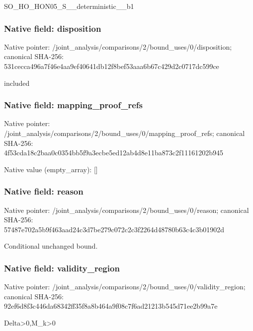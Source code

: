 \documentclass[10pt,a4paper]{article}
\begin{document}
\begingroup\raggedright\sloppy SO\_\allowbreak{}HO\_\allowbreak{}HON05\_\allowbreak{}S\_\allowbreak{}\_\allowbreak{}deterministic\_\allowbreak{}\_\allowbreak{}b1\par\endgroup

\subsubsection{Native field: disposition}
Native pointer: /joint\_\allowbreak{}analysis/comparisons/2/bound\_\allowbreak{}uses/0/disposition; canonical SHA-256: 531cecca496a7f46e4aa9ef40641db12f8bef53aaa6b67c429d2c0717dc599ce

\begingroup\raggedright\sloppy included\par\endgroup

\subsubsection{Native field: mapping\_\allowbreak{}proof\_\allowbreak{}refs}
Native pointer: /joint\_\allowbreak{}analysis/comparisons/2/bound\_\allowbreak{}uses/0/mapping\_\allowbreak{}proof\_\allowbreak{}refs; canonical SHA-256: 4f53cda18c2baa0c0354bb5f9a3ecbe5ed12ab4d8e11ba873c2f11161202b945

Native value (empty\_\allowbreak{}array): []

\subsubsection{Native field: reason}
Native pointer: /joint\_\allowbreak{}analysis/comparisons/2/bound\_\allowbreak{}uses/0/reason; canonical SHA-256: 57487e702a5b9f463aad24c3d7be279c072c2c3f2264d48780b63c4c3b01902d

\begingroup\raggedright\sloppy Conditional unchanged bound.\par\endgroup

\subsubsection{Native field: validity\_\allowbreak{}region}
Native pointer: /joint\_\allowbreak{}analysis/comparisons/2/bound\_\allowbreak{}uses/0/validity\_\allowbreak{}region; canonical SHA-256: 92ef6d8f3c446da68342ff35f8a8b464a9f08c7f6ad21213b545d71ee2b99a7e

\begingroup\raggedright\sloppy Delta>0,\allowbreak{}M\_\allowbreak{}k>0\par\endgroup
\end{document}
